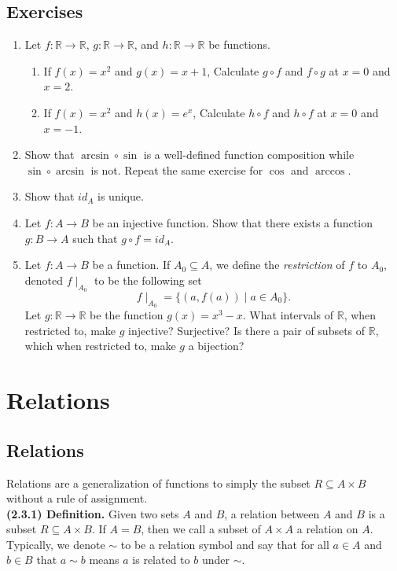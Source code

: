 \documentclass[12pt]{book}
\def\R{{\mathbb{R}}}
\begin{document}
\subsection*{Exercises}
\begin{enumerate}[nolistsep]
\item Let $f\colon\R\rightarrow\R$, $g\colon\R\rightarrow\R$, and $h\colon\R\rightarrow\R$ be functions.
	\begin{enumerate}
	\item If $f(x)=x^2$ and $g(x)=x+1$, Calculate $g\circ f$ and $f\circ g$ at $x=0$ and $x=2$.
	\item If $f(x)=x^2$ and $h(x)=e^x$, Calculate $h\circ f$ and $h\circ f$ at $x=0$ and $x=-1$. 
	\end{enumerate}
\item Show that $\arcsin\circ\sin$ is a well-defined function composition while $\sin\circ\arcsin$ is not. Repeat the same exercise for $\cos$ and $\arccos$.
\item Show that $id_A$ is unique.
\item Let $f\colon A\rightarrow B$ be an injective function. Show that there exists a function $g\colon B\rightarrow A$ such that $g\circ f=id_A$. 
\item Let $f\colon A\rightarrow B$ be a function. If $A_0\subseteq A$, we define the \textit{restriction} of $f$ to $A_0$, denoted $f\mid_{A_0}$ to be the following set
\[f\mid_{A_0}=\{(a,f(a))\mid a\in A_0\}.\] Let $g\colon\R\rightarrow\R$ be the function $g(x)=x^3-x$. What intervals of $\R$, when restricted to, make $g$ injective? Surjective? Is there a pair of subsets of $\R$, which when restricted to, make $g$ a bijection? 
\end{enumerate}

\section{Relations}
\subsection*{Relations}


Relations are a generalization of functions to simply the subset $R\subseteq A\times B$ without a rule of assignment.\\

\noindent\textbf{(2.3.1) Definition.} Given two sets $A$ and $B$, a relation between $A$ and $B$ is a subset $R\subseteq A\times B$. If $A=B$, then we call a subset of $A\times A$ a relation on $A$. Typically, we denote $\sim$ to be a relation symbol and say that for all $a\in A$ and $b\in B$ that $a\sim b$ means $a$ is related to $b$ under $\sim$.\\
\end{document}
